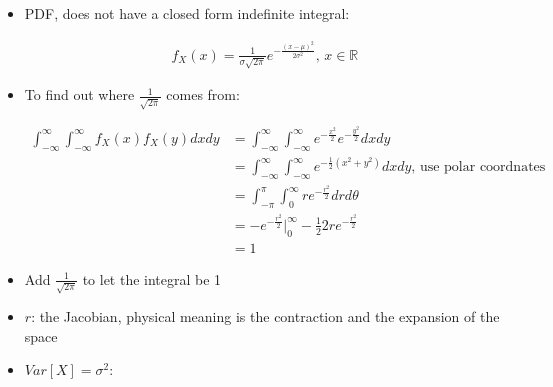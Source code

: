 \documentclass[11pt,letterpaper,titlepage]{article}
\begin{document}
\begin{itemize}
    
    \item PDF, does not have a closed form indefinite integral:
    
    \begin{equation*}
        \begin{aligned}
            f_X(x) = \frac{1}{\sigma \sqrt{2\pi}} e^{-\frac{(x-\mu)^2}{2\sigma^2}} \text{, } x \in \mathbb{R}
        \end{aligned}
    \end{equation*}
    
    \item To find out where $\frac{1}{\sqrt{2\pi}}$ comes from:
    
    \begin{equation*}
        \begin{aligned}
            \int_{-\infty}^{\infty} \int_{-\infty}^{\infty} f_X(x) f_X(y) dx dy &= \int_{-\infty}^{\infty} \int_{-\infty}^{\infty} e^{-\frac{x^2}{2}} e^{-\frac{y^2}{2}} dx dy \\
            &= \int_{-\infty}^{\infty} \int_{-\infty}^{\infty} e^{-\frac{1}{2}(x^2 + y^2)} dx dy \text{, use polar coordnates}\\
            &= \int_{-\pi}^{\pi} \int_{0}^{\infty} r e^{-\frac{r^2}{2}} dr d\theta \\
            &= -e^{-\frac{r^2}{2}}\big|_{0}^{\infty} - \frac{1}{2} 2r e^{-\frac{r^2}{2}} \\
            &= 1
        \end{aligned}
    \end{equation*}
    
    \item Add $\frac{1}{\sqrt{2\pi}}$ to let the integral be 1
    
    \item $r$: the Jacobian, physical meaning is the contraction and the expansion of the space
    
    \item $Var[X] = \sigma^2$:
    

\end{itemize}
\end{document}
